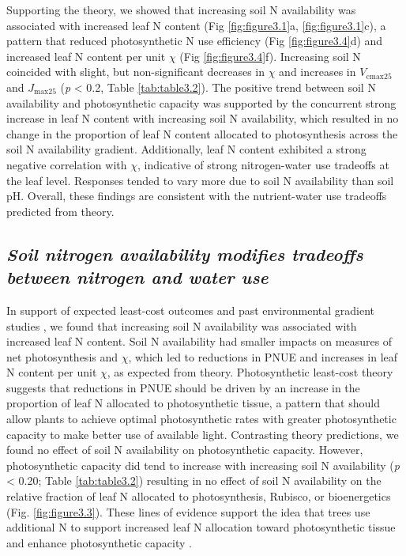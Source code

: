     Supporting the theory, we showed that increasing soil N availability was associated with increased leaf N content (Fig \ref{fig:figure3.1}a, \ref{fig:figure3.1}c), a pattern that reduced photosynthetic N use efficiency (Fig \ref{fig:figure3.4}d) and increased leaf N content per unit $\chi$ (Fig \ref{fig:figure3.4}f). Increasing soil N coincided with slight, but non-significant decreases in $\chi$ and increases in $V_\mathrm{cmax25}$ and $J_\mathrm{max25}$ (\textit{p} < 0.2, Table \ref{tab:table3.2}). The positive trend between soil N availability and photosynthetic capacity was supported by the concurrent strong increase in leaf N content with increasing soil N availability, which resulted in no change in the proportion of leaf N content allocated to photosynthesis across the soil N availability gradient. Additionally, leaf N content exhibited a strong negative correlation with $\chi$, indicative of strong nitrogen-water use tradeoffs at the leaf level. Responses tended to vary more due to soil N availability than soil pH. Overall, these findings are consistent with the nutrient-water use tradeoffs predicted from theory.

    \subsection{\textit{Soil nitrogen availability modifies tradeoffs between nitrogen and water use}}
    In support of expected least-cost outcomes and past environmental gradient studies , we found that increasing soil N availability was associated with increased leaf N content. Soil N availability had smaller impacts on measures of net photosynthesis and $\chi$, which led to reductions in PNUE and increases in leaf N content per unit $\chi$, as expected from theory. Photosynthetic least-cost theory suggests that reductions in PNUE should be driven by an increase in the proportion of leaf N allocated to photosynthetic tissue, a pattern that should allow plants to achieve optimal photosynthetic rates with greater photosynthetic capacity to make better use of available light. Contrasting theory predictions, we found no effect of soil N availability on photosynthetic capacity. However, photosynthetic capacity did tend to increase with increasing soil N availability (\textit{p} < 0.20; Table \ref{tab:table3.2}) resulting in no effect of soil N availability on the relative fraction of leaf N allocated to photosynthesis, Rubisco, or bioenergetics (Fig. \ref{fig:figure3.3}). These lines of evidence support the idea that trees use additional N to support increased leaf N allocation toward photosynthetic tissue and enhance photosynthetic capacity .

